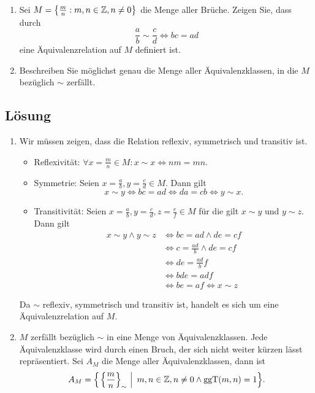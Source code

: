 \documentclass[german,12pt]{homework}
\newcommand{\ZZ}{\mathbb{Z}}
\DeclarePairedDelimiter{\enbrace}{(}{)}
\DeclarePairedDelimiter{\benbrace}{\{}{\}}
\DeclarePairedDelimiter{\penbrace}{\{}{\}}
\begin{document}
    \begin{problem}
        \begin{enumerate}
            \item Sei \(M = \penbrace*{\frac{m}{n}: m, n \in \ZZ, n \ne 0}\)
            die Menge aller Brüche. Zeigen Sie, dass durch
            \[\frac{a}{b} \sim \frac{c}{d} \iff bc = ad\]
            eine Äquivalenzrelation auf \(M\) definiert ist.
            \item Beschreiben Sie möglichst genau die Menge aller
            Äquivalenzklassen, in die \(M\) bezüglich \(\sim\) zerfällt.
        \end{enumerate}
    \end{problem}

    \subsection*{Lösung}
    \begin{enumerate}
        \item Wir müssen zeigen, dass die Relation reflexiv, symmetrisch und
        transitiv ist.
        \begin{itemize}
    		\item Reflexivität: \({\forall}x = \frac{m}{n} \in M: x \sim x \iff
            nm = mn\).
    		\item Symmetrie: Seien \(x = \frac{a}{b}, y = \frac{c}{d} \in M\).
            Dann gilt
    		\[x \sim y \iff bc = ad \iff da = cb \iff y \sim x.\]
    		\item Transitivität: Seien \(x = \frac{a}{b}, y = \frac{c}{d}, z =
            \frac{e}{f} \in M\) für die gilt \(x \sim y\) und \(y \sim z\).
            Dann gilt
    		\begin{align*}
    			x \sim y \land y \sim z &\iff bc = ad \land de = cf\\
    			&\iff c = \frac{ad}{b} \land de = cf\\
    			&\iff de = \frac{ad}{b}f\\
    			&\iff bde = adf\\
    			&\iff be = af \iff x \sim z
    		\end{align*}
    	\end{itemize}
    	Da \(\sim\) reflexiv, symmetrisch und transitiv ist, handelt es sich um
        eine Äquivalenzrelation auf \(M\).
        \item \(M\) zerfällt bezüglich \(\sim\) in eine Menge von
        Äquivalenzklassen. Jede Äquivalenzklasse wird durch einen Bruch, der
        sich nicht weiter kürzen lässt repräsentiert. Sei \(A_M\) die Menge
        aller Äquivalenzklassen, dann ist
    	\[A_M = \penbrace*{\left.\benbrace*{\frac{m}{n}}_\sim\ \right|\ m, n
        \in \mathbb{Z}, n \ne 0 \land \text{ggT}\enbrace*{m, n} = 1}.\]
    \end{enumerate}
\end{document}
